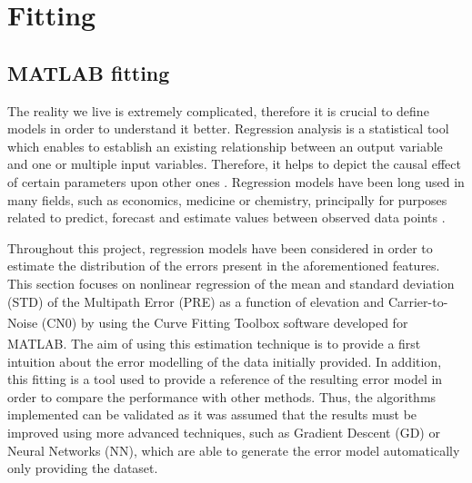 \documentclass[a4paper, report, oneside, UKenglish]{memoir}
\begin{document}
%   

%         

\chapter{Fitting}\label{ch:fitting}

\section{MATLAB fitting}\label{matlabfit}

The reality we live is extremely complicated, therefore it is crucial to define models in order to understand it better. Regression analysis is a statistical tool which enables to establish an existing relationship between an output variable and one or multiple input variables. Therefore, it helps to depict the causal effect of certain parameters upon other ones \cite{IntroToRegresAna}. Regression models have been long used in many fields, such as economics, medicine or chemistry, principally for purposes related to predict, forecast and estimate values between observed data points \cite{MathWorksRegression}.  

Throughout this project, regression models have been considered in order to estimate the distribution of the errors present in the aforementioned features. This section focuses on nonlinear regression of the mean and standard deviation (STD) of the Multipath Error (PRE) as a function of elevation and Carrier-to-Noise (CN0) by using the Curve Fitting Toolbox\textsuperscript{\tiny\texttrademark} software developed for MATLAB\textsuperscript{\tiny\textregistered}. The aim of using this estimation technique is to provide a first intuition about the error modelling of the data initially provided. In addition, this fitting is a tool used to provide a reference of the resulting error model in order to compare the performance with other methods. Thus, the algorithms implemented can be validated as it was assumed that the results must be improved using more advanced techniques, such as Gradient Descent (GD) or Neural Networks (NN), which are able to generate the error model automatically only providing the dataset. 
\end{document}

